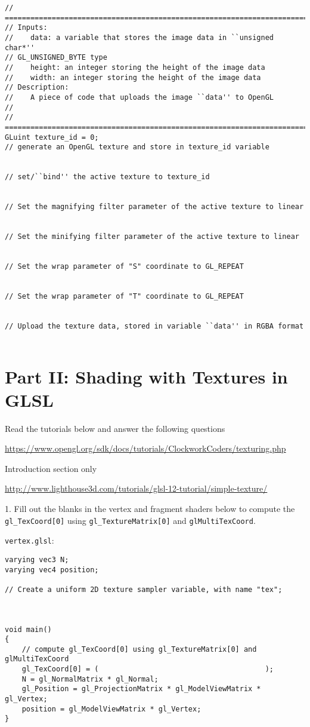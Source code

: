 \documentclass[12pt]{article}
\begin{document}
\begin{lstlisting}
// =======================================================================
// Inputs: 
//    data: a variable that stores the image data in ``unsigned char*''
// GL_UNSIGNED_BYTE type
//    height: an integer storing the height of the image data        
//    width: an integer storing the height of the image data
// Description: 
//    A piece of code that uploads the image ``data'' to OpenGL
//
// =======================================================================
GLuint texture_id = 0;
// generate an OpenGL texture and store in texture_id variable


// set/``bind'' the active texture to texture_id


// Set the magnifying filter parameter of the active texture to linear 


// Set the minifying filter parameter of the active texture to linear 


// Set the wrap parameter of "S" coordinate to GL_REPEAT


// Set the wrap parameter of "T" coordinate to GL_REPEAT


// Upload the texture data, stored in variable ``data'' in RGBA format 


\end{lstlisting}

\section*{Part II: Shading with Textures in GLSL}

Read the tutorials below and answer the following questions

\href{https://www.opengl.org/sdk/docs/tutorials/ClockworkCoders/texturing.php}{https://www.opengl.org/sdk/docs/tutorials/ClockworkCoders/texturing.php}

Introduction section only

\href{http://www.lighthouse3d.com/tutorials/glsl-12-tutorial/simple-texture/}{http://www.lighthouse3d.com/tutorials/glsl-12-tutorial/simple-texture/}

1. Fill out the blanks in the vertex and fragment shaders below to compute the
\texttt{gl\_TexCoord[0]} using \texttt{gl\_TextureMatrix[0]} and
\texttt{glMultiTexCoord}.

\texttt{vertex.glsl}:


\begin{lstlisting}
varying vec3 N;
varying vec4 position;

// Create a uniform 2D texture sampler variable, with name "tex";



void main()
{
    // compute gl_TexCoord[0] using gl_TextureMatrix[0] and glMultiTexCoord
    gl_TexCoord[0] = (                                       );
    N = gl_NormalMatrix * gl_Normal;
    gl_Position = gl_ProjectionMatrix * gl_ModelViewMatrix * gl_Vertex;
    position = gl_ModelViewMatrix * gl_Vertex;
}
\end{lstlisting}
\end{document}
